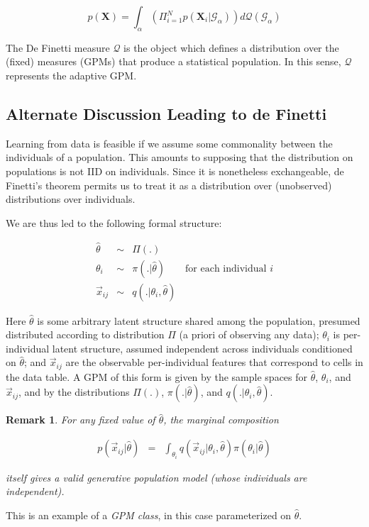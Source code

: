 \documentclass[10pt,letterpaper]{article}
\newtheorem{remark}{Remark}[section]
\newcommand{\G}{\mathcal{G}}
\begin{document}
$$p(\mathbf{X}) = \int_\alpha{(\Pi_{i=1}^Np(\mathbf{X}_i|\G_\alpha))d
\mathcal{Q}(\G_\alpha)}$$

The De Finetti measure $\mathcal{Q}$ is the object which defines a distribution
over the (fixed) measures (GPMs) that produce a statistical population. In this
sense, $\mathcal{Q}$ represents the adaptive GPM.

\subsection{Alternate Discussion Leading to de Finetti}


Learning from data is feasible if we assume some commonality between
the individuals of a population.  This amounts to supposing that the
distribution on populations is not IID on individuals.  Since it
is nonetheless exchangeable, de Finetti's theorem 
permits us to treat it as a distribution over (unobserved) distributions
over individuals.

We are thus led to the following formal structure:

\begin{eqnarray*}
\hat{\theta} & \sim & \Pi(.) \\
\theta_i & \sim & \pi(.|\hat\theta) \qquad \textrm{for each individual $i$} \\
\vec{x}_{ij} & \sim & q(.|\theta_i, \hat\theta)
\end{eqnarray*}

Here $\hat\theta$ is some arbitrary latent structure shared among the
population, presumed distributed according to distribution $\Pi$ (a
priori of observing any data); $\theta_i$ is per-individual latent
structure, assumed independent across individuals conditioned on
$\hat\theta$; and $\vec{x}_{ij}$ are the observable per-individual
features that correspond to cells in the data table.  A GPM of this form is given by the
sample spaces for $\hat\theta$, $\theta_i$, and $\vec{x}_{ij}$, and by the
distributions $\Pi(.)$, $\pi(.|\hat\theta)$, and $q(.|\theta_i, \hat\theta)$.

\begin{remark}
For any fixed value of $\hat\theta$, the marginal composition

\begin{eqnarray}
 p(\vec{x}_{ij}|\hat\theta) & = &
 \int_{\theta_i} q(\vec{x}_{ij}|\theta_i, \hat\theta) \pi(\theta_i|\hat\theta)
 \label{eqn:marginal-individual}
\end{eqnarray}

itself gives a valid generative population model (whose individuals
are independent). \label{rem:gpm-class}
\end{remark}
This is an example of a \emph{GPM class}, in this
case parameterized on $\hat\theta$.
\end{document}

